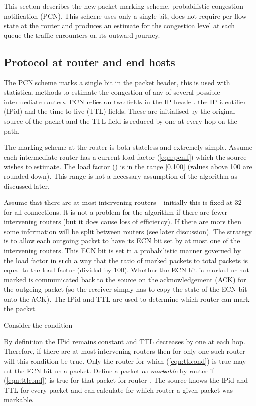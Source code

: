 This section describes the new packet marking scheme, probabilistic
congestion notification (PCN).  This scheme
uses only a single bit, does not require per-flow state at the router
and produces an estimate
for the congestion level at each queue the traffic encounters on its
outward
journey.

\subsection{Protocol at router and end hosts}
\label{sec:protocol}

The PCN scheme marks a single bit in the packet header, this is used
with statistical methods to estimate the congestion of any of several
possible intermediate routers.  PCN relies on two fields in
the IP header: the IP identifier (IPid) and the time to live (TTL)
fields.
These are initialised by the original source of the packet
and the TTL field is reduced by one at every hop on the path.

The marking scheme at the router is both stateless and extremely
simple.
Assume each intermediate router has a current load factor
(\ref{eqn:pcnlf}) which the source wishes to estimate. The load factor
() is in the range  [0,100]
(values above 100 are rounded down).  This range is not a necessary
assumption of
the algorithm as discussed later.

Assume that there are at most  intervening routers 
-- initially this is fixed at 32 for all connections.
It is not a problem for the algorithm if there are fewer intervening
routers (but it does cause loss of efficiency).  If there are more
then some information will be split between routers
(see later
discussion).
The strategy
is to allow each outgoing packet to have its ECN bit set by at most
one of
the intervening routers.  This ECN bit is set in a probabilistic
manner
governed by the load factor in such a way that the ratio of marked
packets
to total packets is equal to the load factor (divided by 100).
Whether the ECN bit is marked or not marked
is communicated back to the source on the acknowledgement (ACK) for
the outgoing packet
(so the receiver simply has to copy the state
of the ECN bit onto the ACK).  The IPid and TTL are used to determine
which router can mark the packet.

Consider the condition

By
definition the IPid remains constant and
TTL decreases by one at each hop.  Therefore,
if there are at most  intervening routers then for only one such
router will this condition be true.  Only the router for which
(\ref{eqn:ttlcond}) is true may set the ECN bit on a packet.
Define a packet as {\em markable\/} by router  if
(\ref{eqn:ttlcond}) is true for that packet for router .
The source knows the IPid and TTL for every packet and
can calculate for which router a given packet was markable.

